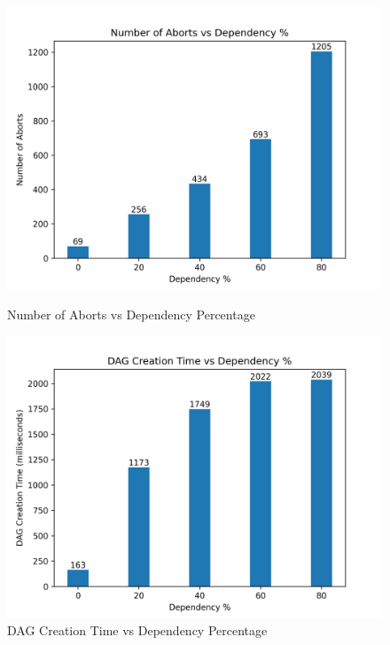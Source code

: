 \documentclass[12pt]{article}
\begin{document}
\begin{figure}[h]
    \centering
    \begin{minipage}
        {0.49\textwidth}
        \includegraphics[width=\textwidth]{images/dp_vs_Aborts.png}
        \caption{Number of Aborts vs Dependency Percentage}
        \label{fig:dp_vs_Aborts}
    \end{minipage}
    \hfill
    \begin{minipage}
        {0.49\textwidth}
        \includegraphics[width=\textwidth]{images/dp_vs_DAGCreationTime.png}
        \caption{DAG Creation Time vs Dependency Percentage}
        \label{fig:dp_vs_DAGCreationTime}
    \end{minipage}
\end{figure}
\end{document}
